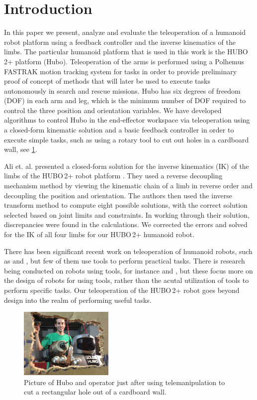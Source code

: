 \documentclass[letterpaper, 10 pt, conference]{IEEEtran}
\begin{document}
\section{Introduction} \label{sec:introduction}
In this paper we present, analyze and evaluate the teleoperation of a humanoid robot platform using a feedback controller and the inverse kinematics of the limbs. The particular humanoid platform that is used in this work is the HUBO$\,$2+ platform (Hubo). Teleoperation of the arms is performed using a Polhemus FASTRAK motion tracking system for tasks in order to provide preliminary proof of concept of methods that will later be used to execute tasks autonomously in search and rescue missions. Hubo has six degrees of freedom (DOF) in each arm and leg, which is the minimum number of DOF required to control the three position and orientation variables. We have developed algorithms to control Hubo in the end-effector workspace via teleoperation using a closed-form kinematic solution and a basic feedback controller in order to execute simple tasks, such as using a rotary tool to cut out holes in a cardboard wall, see \cref{fig:Top-image}.

Ali et. al. presented a closed-form solution for the inverse kinematics (IK) of the limbs of the HUBO$\,$2+ robot platform \cite{Ali:2010wm}. They used a reverse decoupling mechanism method by viewing the kinematic chain of a limb in reverse order and decoupling the position and orientation. The authors then used the inverse transform method to compute eight possible solutions, with the correct solution selected based on joint limits and constraints. In working through their solution, discrepancies were found in the calculations. We corrected the errors and solved for the IK of all four limbs for our HUBO\,2+ humanoid robot. 

There has been significant recent work on teleoperation of humanoid robots, such as \cite{stilman:ke} and \cite{Miller:el}, but few of them use tools to perform practical tasks. There is research being conducted on robots using tools, for instance \cite{Ambrose:2000gx} and \cite{Hasunuma:uk}, but these focus more on the design of robots for using tools, rather than the acutal utilization of tools to perform specific tasks. Our teleoperation of the HUBO$\,$2+ robot goes beyond design into the realm of performing useful tasks.  

\begin{figure}[t]
  \centering
  \includegraphics[width=0.4\textwidth]{figures/Top-image}
  \caption{Picture of Hubo and operator just after using telemanipulation to cut a rectangular hole out of a cardboard wall. }
  \label{fig:Top-image}
\end{figure}
\end{document}
